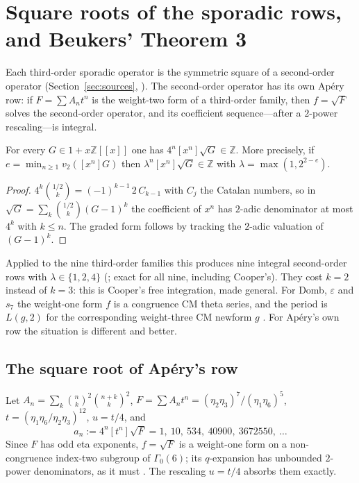 \section{Square roots of the sporadic rows, and Beukers' Theorem 3}\label{sec:sqrt}

Each third-order sporadic operator is the symmetric square of a second-order operator (Section~\ref{sec:sources}, \cite{ProjAnchors}). The second-order operator has its own Ap\'ery row: if $F=\sum A_nt^n$ is the weight-two form of a third-order family, then $f=\sqrt F$ solves the second-order operator, and its coefficient sequence---after a $2$-power rescaling---is integral.

\begin{theorem}\label{thm:sqrt-int}
\Proved{} For every $G\in1+x\mathbb Z[[x]]$ one has $4^n[x^n]\sqrt G\in\mathbb Z$. More precisely, if $e=\min_{n\ge1}v_2([x^n]G)$ then $\lambda^n[x^n]\sqrt G\in\mathbb Z$ with $\lambda=\max(1,2^{2-e})$.
\end{theorem}
\begin{proof}
$4^k\binom{1/2}{k}=(-1)^{k-1}\,2\,C_{k-1}$ with $C_j$ the Catalan numbers, so in $\sqrt G=\sum_k\binom{1/2}{k}(G-1)^k$ the coefficient of $x^n$ has $2$-adic denominator at most $4^k$ with $k\le n$. The graded form follows by tracking the $2$-adic valuation of $(G-1)^k$.
\end{proof}

Applied to the nine third-order families this produces nine integral second-order rows with $\lambda\in\{1,2,4\}$ (\cite{ProjSporadicSearch}; exact for all nine, including Cooper's). They cost $k=2$ instead of $k=3$: this is Cooper's free integration, made general. For Domb, $\varepsilon$ and $s_7$ the weight-one form $f$ is a congruence CM theta series, and the period is $L(g,2)$ for the corresponding weight-three CM newform $g$ . For Ap\'ery's own row the situation is different and better.

\subsection{The square root of Ap\'ery's row}
Let $A_n=\sum_k\binom nk^2\binom{n+k}k^2$, $F=\sum A_nt^n=(\eta_2\eta_3)^7/(\eta_1\eta_6)^5$, $t=(\eta_1\eta_6/\eta_2\eta_3)^{12}$, $u=t/4$, and
\[
a_n:=4^n[t^n]\sqrt{F}=1,\ 10,\ 534,\ 40900,\ 3672550,\ \dots
\]
Since $F$ has odd eta exponents, $f=\sqrt F$ is a weight-one form on a non-congruence index-two subgroup of $\Gamma_0(6)$; its $q$-expansion has unbounded $2$-power denominators, as it must \cite{CDT2024}. The rescaling $u=t/4$ absorbs them exactly.

